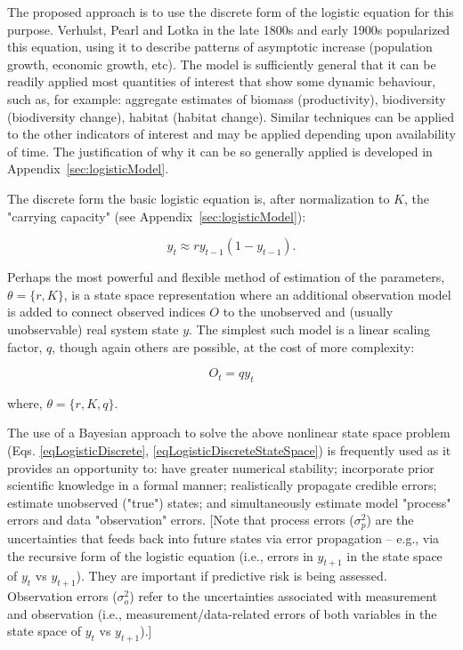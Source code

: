 \documentclass[letterpaper,portrait,11pt]{scrartcl}
\numberwithin{equation}{section}    %
\numberwithin{figure}{section}    %
\numberwithin{table}{section}       %
\begin{document}
The proposed approach is to use the discrete form of the logistic equation for this purpose. Verhulst, Pearl and Lotka in the late 1800s and early 1900s popularized this equation, using it to describe patterns of asymptotic increase (population growth, economic growth, etc). The model is sufficiently general that it can be readily applied most quantities of interest that show some dynamic behaviour, such as, for example: aggregate estimates of biomass (productivity), biodiversity (biodiversity change), habitat (habitat change). Similar techniques can be applied to the other indicators of interest and may be applied depending upon availability of time. The justification of why it can be so generally applied is developed in Appendix~\ref{sec:logisticModel}.

The discrete form the basic logistic equation is, after normalization to $K$, the "carrying capacity" (see Appendix~\ref{sec:logisticModel}):

\begin{equation}
\label{eqLogisticDiscrete}
y_t  \approx r y_{t-1} (1 - y_{t-1} ).
\end{equation}

Perhaps the most powerful and flexible method of estimation of the parameters, $\theta=\{r,K\}$, is a state space representation where an additional observation model is added to connect observed indices $O$ to the unobserved and (usually unobservable) real system state $y$. The simplest such model is a linear scaling factor, $q$, though again others are possible, at the cost of more complexity:

\begin{equation}
\label{eqLogisticDiscreteStateSpace}
O_t = q y_t
\end{equation}


where, $\theta=\{r,K,q\}$.

The use of a Bayesian approach to solve the above nonlinear state space problem (Eqs. \ref{eqLogisticDiscrete}, \ref{eqLogisticDiscreteStateSpace}) is frequently used as it provides an opportunity to: have greater numerical stability; incorporate prior scientific knowledge in a formal manner; realistically propagate credible errors; estimate unobserved ("true") states; and simultaneously estimate model "process" errors and data "observation" errors. [Note that process errors ($\sigma^2_p$) are the uncertainties that feeds back into future states via error propagation -- e.g., via the recursive form of the logistic equation (i.e., errors in $y_{t+1}$ in the state space of $y_t$ vs $y_{t+1}$). They are important if predictive risk is being assessed. Observation errors ($\sigma^2_o$) refer to the uncertainties associated with measurement and observation (i.e., measurement/data-related errors of both variables in the state space of $y_t$ vs $y_{t+1}$).]
\end{document}
